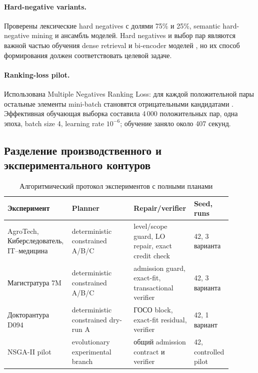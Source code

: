 \documentclass[twoside,11pt]{article}
\begin{document}
\paragraph{Hard-negative variants.}
Проверены лексические hard negatives с долями 75\% и 25\%, semantic hard-negative mining и ансамбль моделей. Hard negatives и выбор пар являются важной частью обучения dense retrieval и bi-encoder моделей \cite{Xiong2021,Thakur2021}, но их способ формирования должен соответствовать целевой задаче.

\paragraph{Ranking-loss pilot.}
Использована Multiple Negatives Ranking Loss: для каждой положительной пары остальные элементы mini-batch становятся отрицательными кандидатами \cite{Henderson2017,Reimers2019}. Эффективная обучающая выборка составила 4\,000 положительных пар, одна эпоха, batch size 4, learning rate $10^{-6}$; обучение заняло около 407 секунд.

\subsection{Разделение производственного и экспериментального контуров}

\begin{table}[H]
\centering
\caption{Алгоритмический протокол экспериментов с полными планами}
\label{tab:planner-protocol}
\begin{tabular}{p{0.28\linewidth}p{0.27\linewidth}p{0.20\linewidth}p{0.14\linewidth}}
\toprule
\textbf{Эксперимент} & \textbf{Planner} & \textbf{Repair/verifier} & \textbf{Seed, runs}\\
\midrule
AgroTech, Киберследователь, IT--медицина & deterministic constrained A/B/C & level/scope guard, LO repair, exact credit check & 42, 3 варианта\\
Магистратура 7M & deterministic constrained A/B/C & admission guard, exact-fit, transactional verifier & 42, 3 варианта\\
Докторантура D094 & deterministic constrained dry-run A & ГОСО block, exact-fit residual, verifier & 42, 1 вариант\\
NSGA-II pilot & evolutionary experimental branch & общий admission contract и verifier & 42, controlled pilot\\
\bottomrule
\end{tabular}
\end{table}
\end{document}
